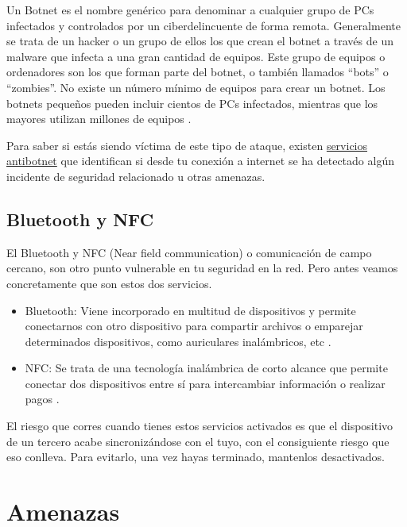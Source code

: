 \documentclass[
  spanish,
  a4paper,
  openany]{book}
\begin{document}
Un Botnet es el nombre genérico para denominar a cualquier grupo de PCs infectados y controlados por un ciberdelincuente de forma remota. Generalmente se trata de un hacker o un grupo de ellos los que crean el botnet a través de un malware que infecta a una gran cantidad de equipos. Este grupo de equipos o ordenadores son los que forman parte del botnet, o también llamados ``bots'' o ``zombies''. No existe un número mínimo de equipos para crear un botnet. Los botnets pequeños pueden incluir cientos de PCs infectados, mientras que los mayores utilizan millones de equipos \citep{INCI-botnet}.

Para saber si estás siendo víctima de este tipo de ataque, existen \href{https://www.osi.es/es/servicio-antibotnet}{servicios antibotnet} que identifican si desde tu conexión a internet se ha detectado algún incidente de seguridad relacionado u otras amenazas.

\hypertarget{bluetooth-y-nfc}{%
\section{Bluetooth y NFC}\label{bluetooth-y-nfc}}

El Bluetooth y NFC (Near field communication) o comunicación de campo cercano, son otro punto vulnerable en tu seguridad en la red. Pero antes veamos concretamente que son estos dos servicios.

\begin{itemize}
\item
  Bluetooth: Viene incorporado en multitud de dispositivos y permite conectarnos con otro dispositivo para compartir archivos o emparejar determinados dispositivos, como auriculares inalámbricos, etc \citep{IONOS-bluetooh}.
\item
  NFC: Se trata de una tecnología inalámbrica de corto alcance que permite conectar dos dispositivos entre sí para intercambiar información o realizar pagos \citep{IONOS-nfc}.
\end{itemize}

El riesgo que corres cuando tienes estos servicios activados es que el dispositivo de un tercero acabe sincronizándose con el tuyo, con el consiguiente riesgo que eso conlleva. Para evitarlo, una vez hayas terminado, mantenlos desactivados.

\hypertarget{amenazas}{%
\chapter{Amenazas}\label{amenazas}}
\end{document}
